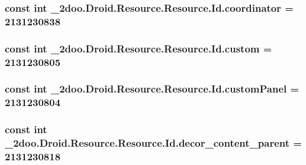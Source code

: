 \hypertarget{class__2doo_1_1_droid_1_1_resource_1_1_id_2d771d4e34ea096877390b631ed6d513}{
\subsubsection[{coordinator}]{\setlength{\rightskip}{0pt plus 5cm}const int \_\-2doo.Droid.Resource.Resource.Id.coordinator = 2131230838}}
\label{class__2doo_1_1_droid_1_1_resource_1_1_id_2d771d4e34ea096877390b631ed6d513}


\hypertarget{class__2doo_1_1_droid_1_1_resource_1_1_id_45495df5ff23d67f0e378c3d1dc310cd}{
\subsubsection[{custom}]{\setlength{\rightskip}{0pt plus 5cm}const int \_\-2doo.Droid.Resource.Resource.Id.custom = 2131230805}}
\label{class__2doo_1_1_droid_1_1_resource_1_1_id_45495df5ff23d67f0e378c3d1dc310cd}


\hypertarget{class__2doo_1_1_droid_1_1_resource_1_1_id_90d57731f0ac2bda08d5e111505ee038}{
\subsubsection[{customPanel}]{\setlength{\rightskip}{0pt plus 5cm}const int \_\-2doo.Droid.Resource.Resource.Id.customPanel = 2131230804}}
\label{class__2doo_1_1_droid_1_1_resource_1_1_id_90d57731f0ac2bda08d5e111505ee038}


\hypertarget{class__2doo_1_1_droid_1_1_resource_1_1_id_dd446edeb1890d0906af3bd8c53072fe}{
\subsubsection[{decor\_\-content\_\-parent}]{\setlength{\rightskip}{0pt plus 5cm}const int \_\-2doo.Droid.Resource.Resource.Id.decor\_\-content\_\-parent = 2131230818}}
\label{class__2doo_1_1_droid_1_1_resource_1_1_id_dd446edeb1890d0906af3bd8c53072fe}


